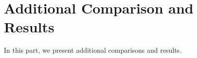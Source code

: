 \section{Additional Comparison and Results}\label{app:compare}
In this part, we present additional comparisons and results.





 